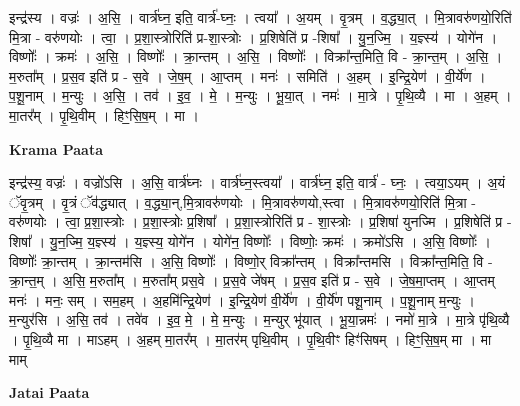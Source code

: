 \documentclass[17pt]{extarticle}
\begin{document}
इन्द्र॑स्य । वज्रः॑ । अ॒सि॒ । वार्त्र॑घ्न॒ इति॒ वार्त्र॑-घ्नः॒ । त्वया᳚ । अ॒यम् । वृ॒त्रम् । व॒द्ध्या॒त् । मि॒त्रावरु॑णयो॒रिति॑ मि॒त्रा - वरु॑णयोः । त्वा॒ । प्र॒शा॒स्त्रोरिति॑ प्र-शा॒स्त्रोः । प्र॒शिषेति॑ प्र -शिषा᳚ । यु॒न॒ज्मि॒ । य॒ज्ञ्स्य॑ । योगे॑न । विष्णोः᳚ । क्रमः॑ । अ॒सि॒ । विष्णोः᳚ । क्रा॒न्तम् । अ॒सि॒ । विष्णोः᳚ । विक्रा᳚न्त॒मिति॒ वि - क्रा॒न्त॒म् । अ॒सि॒ । म॒रुता᳚म् । प्र॒स॒व इति॑ प्र - स॒वे । जे॒ष॒म् । आ॒प्तम् । मनः॑ । समिति॑ । अ॒हम् । इ॒न्द्रि॒येण॑ । वी॒र्ये॑ण । प॒शू॒नाम् । म॒न्युः । अ॒सि॒ । तव॑ । इ॒व॒ । मे॒ । म॒न्युः । भू॒या॒त् । नमः॑ । मा॒त्रे । पृ॒थि॒व्यै । मा । अ॒हम् । मा॒तर᳚म् । पृ॒थि॒वीम् । हिꣳ॒॒सि॒ष॒म् । मा ।  \newline


\textbf{Krama Paata} \newline

इन्द्र॑स्य॒ वज्रः॑ । वज्रो॑ऽसि । अ॒सि॒ वार्त्र॑घ्नः । वार्त्र॑घ्न॒स्त्वया᳚ । वार्त्र॑घ्न॒ इति॒ वार्त्र॑ - घ्नः॒ । त्वया॒ऽयम् । अ॒यं ॅवृ॒त्रम् । वृ॒त्रं ॅव॑द्ध्यात् । व॒द्ध्या॒न्,मि॒त्रावरु॑णयोः । मि॒त्रावरु॑णयो,स्त्वा । मि॒त्रावरु॑णयो॒रिति॑ मि॒त्रा - वरु॑णयोः । त्वा॒ प्र॒शा॒स्त्रोः । प्र॒शा॒स्त्रोः प्र॒शिषा᳚ । प्र॒शा॒स्त्रोरिति॑ प्र - शा॒स्त्रोः । प्र॒शिषा॑ युनज्मि । प्र॒शिषेति॑ प्र - शिषा᳚ । यु॒न॒ज्मि॒ य॒ज्ञ्स्य॑ । य॒ज्ञ्स्य॒ योगे॑न । योगे॑न॒ विष्णोः᳚ । विष्णोः॒ क्रमः॑ । क्रमो॑ऽसि । अ॒सि॒ विष्णोः᳚ । विष्णोः᳚ क्रा॒न्तम् । क्रा॒न्तम॑सि । अ॒सि॒ विष्णोः᳚ । विष्णो॒र् विक्रा᳚न्तम् । विक्रा᳚न्तमसि । विक्रा᳚न्त॒मिति॒ वि - क्रा॒न्त॒म् । अ॒सि॒ म॒रुता᳚म् । म॒रुता᳚म् प्रस॒वे । प्र॒स॒वे जे॑षम् । प्र॒स॒व इति॑ प्र - स॒वे । जे॒ष॒मा॒प्तम् । आ॒प्तम् मनः॑ । मनः॒ सम् । सम॒हम् । अ॒हमि॑न्द्रि॒येण॑ । इ॒न्द्रि॒येण॑ वी॒र्ये॑ण । वी॒र्ये॑ण पशू॒नाम् । प॒शू॒नाम् म॒न्युः । म॒न्युर॑सि । अ॒सि॒ तव॑ । तवे॑व । इ॒व॒ मे॒ । मे॒ म॒न्युः । म॒न्युर् भू॑यात् । भू॒या॒न्नमः॑ । नमो॑ मा॒त्रे । मा॒त्रे पृ॑थि॒व्यै । पृ॒थि॒व्यै मा । माऽहम् । अ॒हम् मा॒तर᳚म् । मा॒तर॑म् पृथि॒वीम् । पृ॒थि॒वीꣳ हिꣳ॑सिषम् । हिꣳ॒॒सि॒ष॒म् मा । मा माम् \newline

\textbf{Jatai Paata} \newline
\end{document}
